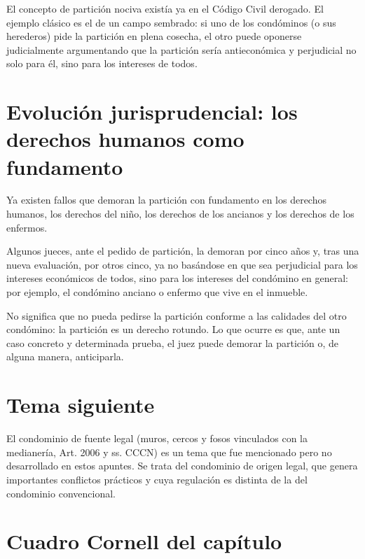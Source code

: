 \documentclass[12pt,oneside]{book}
\begin{document}
El concepto de partición nociva existía ya en el Código Civil derogado. El ejemplo clásico es el de un campo sembrado: si uno de los condóminos (o sus herederos) pide la partición en plena cosecha, el otro puede oponerse judicialmente argumentando que la partición sería antieconómica y perjudicial no solo para él, sino para los intereses de todos.

\section{Evolución jurisprudencial: los derechos humanos como fundamento}

\begin{important}
Ya existen fallos que demoran la partición con fundamento en los derechos humanos, los derechos del niño, los derechos de los ancianos y los derechos de los enfermos.
\end{important}

Algunos jueces, ante el pedido de partición, la demoran por cinco años y, tras una nueva evaluación, por otros cinco, ya no basándose en que sea perjudicial para los intereses económicos de todos, sino para los intereses del condómino en general: por ejemplo, el condómino anciano o enfermo que vive en el inmueble.


\begin{note}
No significa que no pueda pedirse la partición conforme a las calidades del otro condómino: la partición es un derecho rotundo. Lo que ocurre es que, ante un caso concreto y determinada prueba, el juez puede demorar la partición o, de alguna manera, anticiparla.
\end{note}

\section{Tema siguiente}

El condominio de fuente legal (muros, cercos y fosos vinculados con la medianería, Art. 2006 y ss. CCCN) es un tema que fue mencionado pero no desarrollado en estos apuntes. Se trata del condominio de origen legal, que genera importantes conflictos prácticos y cuya regulación es distinta de la del condominio convencional.

\section{Cuadro Cornell del capítulo}
\end{document}
